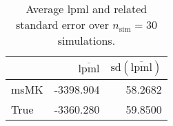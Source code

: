 \begin{table}[H]

\caption{Average lpml and related standard error over $n_{\text{sim}} = 30$ simulations.}
\centering
\begin{tabular}[t]{lrr}
\toprule
  & $\overbar{\text{lpml}}$ & $\text{sd}(\overbar{\text{lpml}})$\\
\midrule
msMK & -3398.904 & 58.2682\\
True & -3360.280 & 59.8500\\
\bottomrule
\end{tabular}
\end{table}